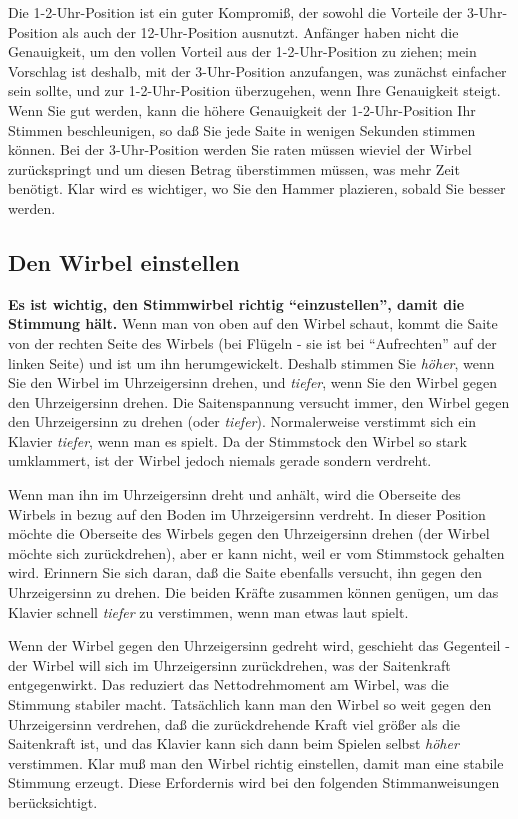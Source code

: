 Die 1-2-Uhr-Position ist ein guter Kompromiß, der sowohl die Vorteile der 3-Uhr-Position als auch der 12-Uhr-Position ausnutzt.
 Anfänger haben nicht die Genauigkeit, um den vollen Vorteil aus der 1-2-Uhr-Position zu ziehen; mein Vorschlag ist deshalb, mit der 3-Uhr-Position anzufangen, was zunächst einfacher sein sollte, und zur 1-2-Uhr-Position überzugehen, wenn Ihre Genauigkeit steigt.
 Wenn Sie gut werden, kann die höhere Genauigkeit der 1-2-Uhr-Position Ihr Stimmen beschleunigen, so daß Sie jede Saite in wenigen Sekunden stimmen können.
 Bei der 3-Uhr-Position werden Sie raten müssen wieviel der Wirbel zurückspringt und um diesen Betrag überstimmen müssen, was mehr Zeit benötigt.
 Klar wird es wichtiger, wo Sie den Hammer plazieren, sobald Sie besser werden.
 \hypertarget{c2_5c}{}\hypertarget{c2_5_wirb}{}

\subsection{Den Wirbel einstellen}

\textbf{Es ist wichtig, den Stimmwirbel richtig \enquote{einzustellen}, damit die Stimmung hält.}
 Wenn man von oben auf den Wirbel schaut, kommt die Saite von der rechten Seite des Wirbels (bei Flügeln - sie ist bei \enquote{Aufrechten} auf der linken Seite) und ist um ihn herumgewickelt.
 Deshalb stimmen Sie \textit{höher}, wenn Sie den Wirbel im Uhrzeigersinn drehen, und \textit{tiefer}, wenn Sie den Wirbel gegen den Uhrzeigersinn drehen.
 Die Saitenspannung versucht immer, den Wirbel gegen den Uhrzeigersinn zu drehen (oder \textit{tiefer}).
 Normalerweise verstimmt sich ein Klavier \textit{tiefer}, wenn man es spielt.
 Da der Stimmstock den Wirbel so stark umklammert, ist der Wirbel jedoch niemals gerade sondern verdreht.
 

Wenn man ihn im Uhrzeigersinn dreht und anhält, wird die Oberseite des Wirbels in bezug auf den Boden im Uhrzeigersinn verdreht.
 In dieser Position möchte die Oberseite des Wirbels gegen den Uhrzeigersinn drehen (der Wirbel möchte sich zurückdrehen), aber er kann nicht, weil er vom Stimmstock gehalten wird.
 Erinnern Sie sich daran, daß die Saite ebenfalls versucht, ihn gegen den Uhrzeigersinn zu drehen.
 Die beiden Kräfte zusammen können genügen, um das Klavier schnell \textit{tiefer} zu verstimmen, wenn man etwas laut spielt.
 

Wenn der Wirbel gegen den Uhrzeigersinn gedreht wird, geschieht das Gegenteil - der Wirbel will sich im Uhrzeigersinn zurückdrehen, was der Saitenkraft entgegenwirkt.
 Das reduziert das Nettodrehmoment am Wirbel, was die Stimmung stabiler macht.
 Tatsächlich kann man den Wirbel so weit gegen den Uhrzeigersinn verdrehen, daß die zurückdrehende Kraft viel größer als die Saitenkraft ist, und das Klavier kann sich dann beim Spielen selbst \textit{höher} verstimmen.
 Klar muß man den Wirbel richtig einstellen, damit man eine stabile Stimmung erzeugt.
 Diese Erfordernis wird bei den folgenden Stimmanweisungen berücksichtigt.
 \hypertarget{c2_5d}{}\hypertarget{c2_5_unis}{}

